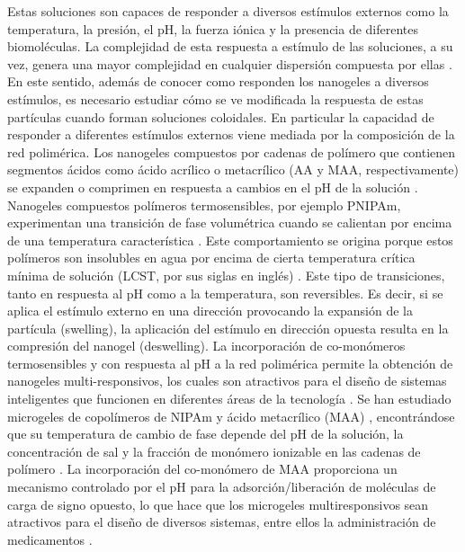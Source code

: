 	Estas soluciones son capaces de responder a diversos est\'imulos externos como la temperatura, la presi\'on, el pH, la fuerza i\'onica y la presencia de diferentes biomol\'eculas.
	La complejidad de esta respuesta a est\'imulo de las soluciones, a su vez, genera una mayor complejidad en cualquier dispersi\'on compuesta por ellas \cite{lyon2012polymer}.
	En este sentido, adem\'as de conocer como responden los nanogeles a diversos est\'imulos, es necesario estudiar c\'omo se ve modificada la respuesta de estas part\'iculas cuando forman soluciones coloidales. 
	En particular la  capacidad de responder a diferentes est\'imulos externos viene mediada por la composici\'on de la red polim\'erica. Los nanogeles compuestos por cadenas de pol\'imero que contienen segmentos \'acidos como \'acido acr\'ilico o metacr\'ilico (AA y MAA, respectivamente) se expanden o comprimen en respuesta a cambios en el pH de la soluci\'on \cite{snowden1996colloidal, Zhou1998}. Nanogeles compuestos pol\'imeros termosensibles, por ejemplo PNIPAm, experimentan una transici\'on de fase volum\'etrica cuando se calientan por encima de una temperatura caracter\'istica \cite{Pelton1986, Pelton2000}. Este comportamiento se origina porque estos pol\'imeros son insolubles en agua por encima de cierta temperatura cr\'itica m\'inima de soluci\'on (LCST, por sus siglas en ingl\'es) \cite{Kawaguchi2020}.
	Este tipo de  transiciones, tanto en respuesta al pH como a la temperatura, son reversibles. Es decir, si se aplica el est\'imulo externo en una direcci\'on provocando la expansi\'on de la part\'icula (swelling), la aplicaci\'on del est\'imulo en direcci\'on opuesta resulta en la compresi\'on del nanogel (deswelling).
	La incorporaci\'on de co-mon\'omeros termosensibles y con respuesta al pH a la red polim\'erica permite la obtenci\'on de nanogeles multi-responsivos, los cuales son atractivos para el dise\~no de sistemas inteligentes que funcionen en diferentes \'areas de la tecnolog\'ia \cite{plamper2017functional}. Se han estudiado microgeles de copol\'imeros de NIPAm y \'acido metacr\'ilico (MAA) \cite{Dowding2000, Hoare2004, Giussi2015}, encontr\'andose que su temperatura de cambio de fase depende del pH de la soluci\'on, la concentraci\'on de sal y la fracci\'on de mon\'omero ionizable en las cadenas de pol\'imero \cite{Morris1997, Jones2000, Hoare2004, Bradley2005, Lee2008, Wong2009, Hamzavi2016}. La incorporaci\'on del co-mon\'omero de MAA proporciona un mecanismo controlado por el pH para la adsorci\'on/liberaci\'on de mol\'eculas de carga de signo opuesto, lo que hace que los microgeles multiresponsivos sean atractivos para el dise\~no de diversos sistemas, entre ellos la administraci\'on de medicamentos \cite{Liu2017}.

